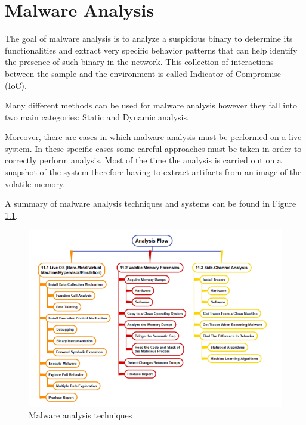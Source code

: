 
\chapter{Malware Analysis}
\label{chap:2}


The goal of malware analysis is to analyze a suspicious binary to determine its functionalities and extract very specific behavior patterns that can help identify the presence of such binary in the network. This collection of interactions between the sample and the environment is called Indicator of Compromise (IoC).

Many different methods can be used for malware analysis however they fall into two main categories: Static and Dynamic analysis. 

Moreover, there are cases in which malware analysis must be performed on a live system. In these specific cases some careful approaches must be taken in order to correctly perform analysis. Most of the time the analysis is carried out on a snapshot of the system therefore having to extract artifacts from an image of the volatile memory.

A summary of malware analysis techniques and systems can be found in Figure \ref{fig:mat}.

\noindent
\begin{figure}[htp]
\centering
\includegraphics[width=\linewidth]{images/dynanalysis.png}
\caption{Malware analysis techniques}
\label{fig:mat}
\end{figure}

